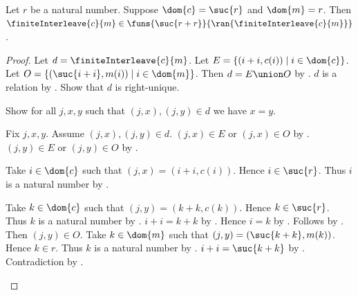 \begin{proposition}\label{finite_interleave_function}
    Let $r$ be a natural number.
    Suppose $\dom{c}=\suc{r}$ and $\dom{m}=r$.
    Then $\finiteInterleave{c}{m}\in
        \funs{\suc{r+r}}{\ran{\finiteInterleave{c}{m}}}$.
\end{proposition}
\begin{proof}
    Let $d=\finiteInterleave{c}{m}$.
    Let $E=\{(i+i,c(i))\mid i\in\dom{c}\}$.
    Let $O=\{(\suc{i+i},m(i))\mid i\in\dom{m}\}$.
    Then $d=E\union O$ by .
    $d$ is a relation
        by .
    Show that $d$ is right-unique.
    \begin{subproof}
        Show for all $j,x,y$ such that $(j,x),(j,y)\in d$ we have $x=y$.
        \begin{subproof}
            Fix $j,x,y$.
            Assume $(j,x),(j,y)\in d$.
            $(j,x)\in E$ or $(j,x)\in O$ by .
            $(j,y)\in E$ or $(j,y)\in O$ by .
            \begin{byCase}
                Take $i\in\dom{c}$ such that
                    $(j,x)=(i+i,c(i))$.
                Hence $i\in\suc{r}$.
                Thus $i$ is a natural number
                    by .
                \begin{byCase}
                    Take $k\in\dom{c}$ such that
                        $(j,y)=(k+k,c(k))$.
                    Hence $k\in\suc{r}$.
                    Thus $k$ is a natural number
                        by .
                    $i+i=k+k$ by .
                    Hence $i=k$ by .
                    Follows by .
                    Then $(j,y)\in O$.
                    Take $k\in\dom{m}$ such that
                        $(j,y)=(\suc{k+k},m(k))$.
                    Hence $k\in r$.
                    Thus $k$ is a natural number
                        by .
                    $i+i=\suc{k+k}$ by .
                    Contradiction by .
                \end{byCase}

\end{byCase}
\end{subproof}
\end{subproof}
\end{proof}
